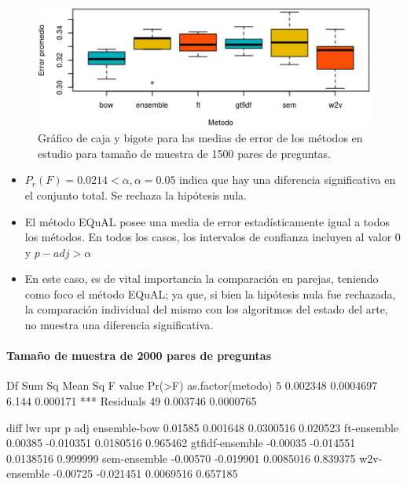 \begin{figure}
	\centering
	\includegraphics[width=0.7\linewidth]{10_resultados/imagenes/anova_1500}
	\caption{Gráfico de caja y bigote para las medias de error de los métodos en estudio para tamaño de muestra de 1500 pares de preguntas.}
	\label{fig:anova1500}
\end{figure}

\begin{itemize}
	\item \(P_r(F)= 0.0214 < \alpha, \alpha = 0.05\) indica que hay una diferencia significativa en el conjunto total. Se rechaza la hipótesis nula.
	\item El método EQuAL posee una media de error estadísticamente igual a todos los métodos. En todos los casos, los intervalos de confianza incluyen al valor 0 y \(p-adj > \alpha\)
	\item En este caso, es de vital importancia la comparación en parejas, teniendo como foco el método EQuAL; ya que, si bien la hipótesis nula fue rechazada, la comparación individual del mismo con los algoritmos del estado del arte, no muestra una diferencia significativa.
\end{itemize}

\paragraph{Tamaño de muestra de 2000 pares de preguntas}

\begin{rc}
                 Df   Sum Sq   Mean Sq F value   Pr(>F)
as.factor(metodo)  5 0.002348 0.0004697   6.144 0.000171 ***
Residuals         49 0.003746 0.0000765
\end{rc}

\begin{rc}
                  diff       lwr       upr      p adj
ensemble-bow     0.01585  0.001648 0.0300516 0.020523
ft-ensemble      0.00385 -0.010351 0.0180516 0.965462
gtfidf-ensemble -0.00035 -0.014551 0.0138516 0.999999
sem-ensemble    -0.00570 -0.019901 0.0085016 0.839375
w2v-ensemble    -0.00725 -0.021451 0.0069516 0.657185
\end{rc}

